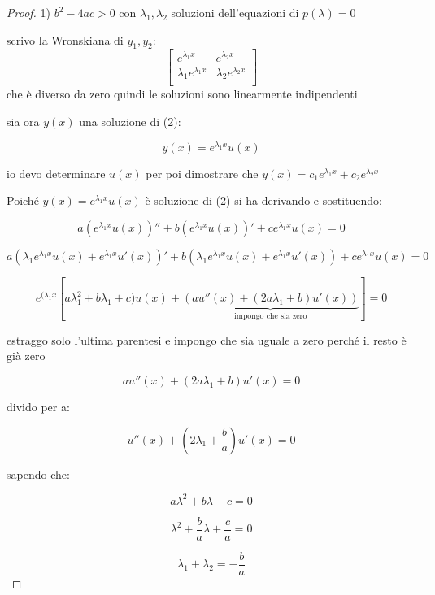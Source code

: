 \documentclass[11pt]{article}
\begin{document}
\begin{proof}
       1) $b^{2}-4ac >0$ con $\lambda_1,\lambda_2$ soluzioni dell'equazioni di $p(\lambda)=0$    

       scrivo la Wronskiana di $y_1,y_2$:
       \[
        \begin{bmatrix}
            
        e ^{\lambda_1 x} & e ^{\lambda_2 x} \\
        \lambda_1e ^{\lambda_1 x} & \lambda_2e ^{\lambda_2 x} \\
        
        \end{bmatrix}
       \]
        che è diverso da zero quindi le soluzioni sono linearmente indipendenti

        sia ora $y(x)$ una soluzione di (2):

        \[
            y(x) = e ^{\lambda_1 x}u(x)
        \]

        io devo determinare $u(x)$ per poi dimostrare che $y(x) = c_1e ^{\lambda_1 x}+c_2 e^{\lambda_2 x}$

        Poiché $y(x) = e ^{\lambda_1 x}u(x)$ è soluzione di (2) si ha derivando e sostituendo:

        \[
            a( e ^{\lambda_1 x} u(x))'' + b(e ^{\lambda_1 x}u(x))'+ c e ^{\lambda_1 x}u(x) =0
        \]

        \[
            a(\lambda_1 e ^{\lambda_1 x} u(x)+ e ^{\lambda_1 x}u'(x))' + b(\lambda_1e ^{\lambda_1 x}u(x) + e ^{\lambda_1 x}u'(x))+ c e ^{\lambda_1 x}u(x) =0
        \]

        \[
            e ^{(\lambda_1 x}[a \lambda_1 ^{2} + b \lambda_1+c)u(x)+\underbrace{(au''(x)+(2a \lambda_1 + b)u'(x))}_\text{impongo che sia zero}]=0
        \]

        estraggo solo l'ultima parentesi e impongo che sia uguale a zero perché il resto è già zero

        \[
            au''(x) + (2a \lambda_1 + b) u'(x) = 0
        \]

        divido per a:

        \[
            u''(x) +(2 \lambda_1 + \frac{b}{a}) u'(x) = 0
        \]

        sapendo che:

        \[
            a \lambda^{2} + b \lambda + c =0
        \]

        \[
             \lambda^{2} + \frac{b}{a} \lambda + \frac{c}{a} =0
        \]

        \[
            \lambda_1 + \lambda_2 = -\frac{b}{a}
        \]


\end{proof}
\end{document}
